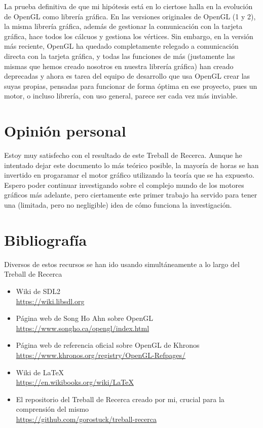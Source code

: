 La prueba definitiva de que mi hipótesis está en lo ciertose halla en la evolución de OpenGL como librería gráfica. En las versiones originales de OpenGL (1 y 2), la misma librería gráfica, además de gestionar la comunicación con la tarjeta gráfica, hace todos los cálcuos y gestiona los vértices. Sin embargo, en la versión más reciente, OpenGL ha quedado completamente relegado a comunicación directa con la tarjeta gráfica, y todas las funciones de más (justamente las mismas que hemos creado nosotros en nuestra librería gráfica) han creado deprecadas y ahora es tarea del equipo de desarrollo que usa OpenGL crear las suyas propias, pensadas para funcionar de forma óptima en ese proyecto, pues un motor, o incluso librería, con uso general, parece ser cada vez más inviable.

\section{Opinión personal}
Estoy muy satisfecho con el resultado de este Treball de Recerca. Aunque he intentado dejar este documento lo más teórico posible, la mayoría de horas se han invertido en progaramar el motor gráfico utilizando la teoría que se ha expuesto. Espero poder continuar investigando sobre el complejo mundo de los motores gráficos más adelante, pero ciertamente este primer trabajo ha servido para tener una (limitada, pero no negligible) idea de cómo funciona la investigación.

\section{Bibliografía}
Diversos de estos recursos se han ido usando simultáneamente a lo largo del Treball de Recerca
\begin{itemize}
\item{Wiki de SDL2 \\ \url{https://wiki.libsdl.org}}
\item{Página web de Song Ho Ahn sobre OpenGL \\\url{https://www.songho.ca/opengl/index.html}}
\item{Página web de referencia oficial sobre OpenGL de Khronos \\\url{https://www.khronos.org/registry/OpenGL-Refpages/}}
\item{Wiki de \LaTeX \\ \url{https://en.wikibooks.org/wiki/LaTeX}}
\item{El repositorio del Treball de Recerca creado por mi, crucial para la comprensión del mismo\\
  \url{https://github.com/gorostuck/treball-recerca}}
\end{itemize}
